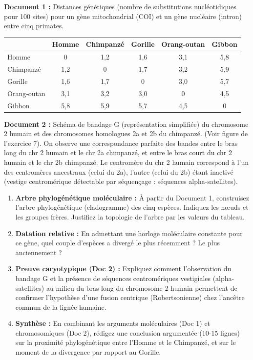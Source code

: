 \documentclass[11pt]{article}
\begin{document}
\begin{exercice}
\textbf{Document 1 :} Distances génétiques (nombre de substitutions nucléotidiques pour 100 sites) pour un gène mitochondrial (COI) et un gène nucléaire (intron) entre cinq primates.
\begin{center}
\begin{tabular}{|l|ccccc|}\hline
& \textbf{Homme} & \textbf{Chimpanzé} & \textbf{Gorille} & \textbf{Orang-outan} & \textbf{Gibbon} \\ \hline
Homme & 0 & 1,2 & 1,6 & 3,1 & 5,8 \\
Chimpanzé & 1,2 & 0 & 1,7 & 3,2 & 5,9 \\
Gorille & 1,6 & 1,7 & 0 & 3,0 & 5,7 \\
Orang-outan & 3,1 & 3,2 & 3,0 & 0 & 4,5 \\
Gibbon & 5,8 & 5,9 & 5,7 & 4,5 & 0 \\ \hline
\end{tabular}
\end{center}

\textbf{Document 2 :} Schéma de bandage G (représentation simplifiée) du chromosome 2 humain et des chromosomes homologues 2a et 2b du chimpanzé. (Voir figure de l'exercice 7). On observe une correspondance parfaite des bandes entre le bras long du chr 2 humain et le chr 2a chimpanzé, et entre le bras court du chr 2 humain et le chr 2b chimpanzé. Le centromère du chr 2 humain correspond à l'un des centromères ancestraux (celui du 2a), l'autre (celui du 2b) étant inactivé (vestige centromérique détectable par séquençage : séquences alpha-satellites).

\begin{enumerate}
    \item \textbf{Arbre phylogénétique moléculaire :} À partir du Document 1, construisez l'arbre phylogénétique (cladogramme) des cinq espèces. Indiquez les nœuds et les groupes frères. Justifiez la topologie de l'arbre par les valeurs du tableau.
    \item \textbf{Datation relative :} En admettant une horloge moléculaire constante pour ce gène, quel couple d'espèces a divergé le plus récemment ? Le plus anciennement ?
    \item \textbf{Preuve caryotypique (Doc 2) :} Expliquez comment l'observation du bandage G et la présence de séquences centromériques vestigiales (alpha-satellites) au milieu du bras long du chromosome 2 humain permettent de confirmer l'hypothèse d'une fusion centrique (Robertsonienne) chez l'ancêtre commun de la lignée humaine.
    \item \textbf{Synthèse :} En combinant les arguments moléculaires (Doc 1) et chromosomiques (Doc 2), rédigez une conclusion argumentée (10-15 lignes) sur la proximité phylogénétique entre l'Homme et le Chimpanzé, et sur le moment de la divergence par rapport au Gorille.
\end{enumerate}
\end{exercice}
\end{document}
